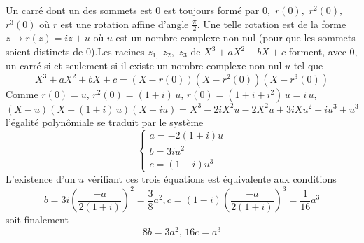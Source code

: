 Un carr{\'e} dont un des sommets est $0$ est toujours form{\'e} par $0,$ $%
r(0),$ $r^2(0),$ $r^3(0)$ o{\`u} $r$ est une rotation affine d'angle
$\frac
\pi 2$. Une telle rotation est de la forme $z\rightarrow r(z)=iz+u$ o{\`u} $%
u $ est un nombre complexe non nul (pour que les sommets soient
distincts de 0).\newline Les racines $z_{1,}$ $z_2,$ $z_3$ de
$X^3+aX^2+bX+c$ forment, avec 0, un carr{\'e} si et seulement si il
existe un nombre complexe non nul $u$ tel que
\[
X^3+aX^2+bX+c=(X-r(0))(X-r^2(0))(X-r^3(0))
\]
Comme $r(0)=u$, $r^2(0)=(1+i)\,u$, $r(0)=(1+i+i^2)\,u=i\,u$,
\[
(X-u)(X-(1+i)\,u)(X-iu)=X^3-2iX^2u-2X^2u+3iXu^2-iu^3+u^3
\]
l'{\'e}galit{\'e} polyn{\^o}miale se traduit par le syst{\`e}me
\[
\left\{
\begin{array}{l}
a=-2(1+i)u \\
b=3iu^2 \\
c=(1-i)u^3
\end{array}
\right.
\]
L'existence d'un $u$ v{\'e}rifiant ces trois {\'e}quations est {\'e}quivalente
aux conditions
\[
b=3i(\frac{-a}{2(1+i)})^2=\frac
38a^2,c=(1-i)(\frac{-a}{2(1+i)})^3=\frac 1{16}a^3
\]
soit finalement
\[
8b=3a^2\text{, }16c=a^3
\]
